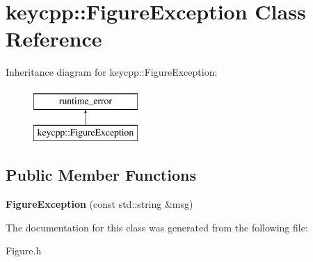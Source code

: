 \hypertarget{classkeycpp_1_1_figure_exception}{\section{keycpp\-:\-:Figure\-Exception Class Reference}
\label{classkeycpp_1_1_figure_exception}
}
Inheritance diagram for keycpp\-:\-:Figure\-Exception\-:\begin{figure}[H]
\begin{center}
\leavevmode
\includegraphics[height=2.000000cm]{classkeycpp_1_1_figure_exception}
\end{center}
\end{figure}
\subsection*{Public Member Functions}
\begin{DoxyCompactItemize}
\item 
\hypertarget{classkeycpp_1_1_figure_exception_aacd7cab583d3eea1ddd185a8fd7b1133}{{\bfseries Figure\-Exception} (const std\-::string \&msg)}\label{classkeycpp_1_1_figure_exception_aacd7cab583d3eea1ddd185a8fd7b1133}

\end{DoxyCompactItemize}


The documentation for this class was generated from the following file\-:\begin{DoxyCompactItemize}
\item 
Figure.\-h\end{DoxyCompactItemize}
